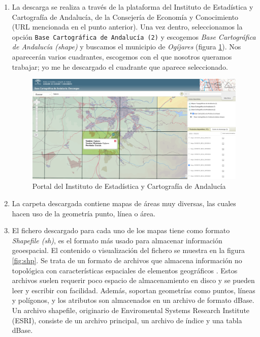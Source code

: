 \begin{enumerate}
	\item La descarga se realiza a través de la plataforma del Instituto de Estadística y Cartografía de Andalucía, de la Consejería de Economía y Conocimiento (URL mencionada en el punto anterior). Una vez dentro, seleccionamos la opción \texttt{Base Cartográfica de Andalucía (2)} y escogemos \textit{Base Cartográfica de Andalucía (shape)} y buscamos el municipio de \textit{Ogíjares} (figura \ref{fig:obtencion-informacion}). Nos aparecerán varios cuadrantes, escogemos con el que nosotros queramos trabajar; yo me he descargado el cuadrante que aparece seleccionado.

	\begin{figure}[H]
		\centering
		\includegraphics[width=1\linewidth]{imagenes/capitulo4/obtencion-informacion}
		\caption{Portal del Instituto de Estadística y Cartografía de Andalucía}
		\label{fig:obtencion-informacion}
	\end{figure}

	\item La carpeta descargada contiene mapas de áreas muy diversas, las cuales hacen uso de la geometría punto, línea o área. 

	\item El fichero descargado para cada uno de los mapas tiene como formato \textit{Shapefile (sh)}, es el formato más usado para almacenar información geoespacial. El contenido o visualización del fichero se muestra en la figura \ref{fig:shp}. Se trata de un formato de archivos que almacena información no topológica con características espaciales de elementos geográficos \cite{tesis}. Estos archivos suelen requerir poco espacio de almacenamiento en disco y se pueden leer y escribir con facilidad. Además, soportan geometrías como puntos, líneas y polígonos, y los atributos son almacenados en un archivo de formato dBase. Un archivo shapefile, originario de Enviromental Systems Research Institute (ESRI), consiste de un archivo principal, un archivo de índice y una tabla dBase. 
	

\end{enumerate}
